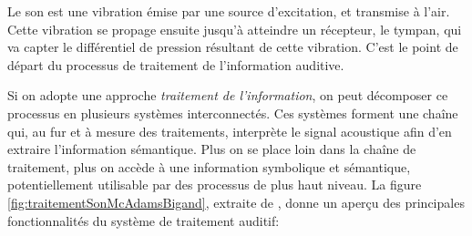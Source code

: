 Le son est une vibration émise par une source d'excitation, et transmise à l'air. Cette vibration se propage ensuite jusqu'à atteindre un récepteur, le tympan, qui va capter le différentiel de pression résultant de cette vibration. C'est le point de départ du processus de traitement de l'information auditive. 

Si on adopte une approche \emph{traitement de l'information}, on peut décomposer ce processus en plusieurs systèmes interconnectés. Ces systèmes forment une chaîne qui, au fur et à mesure des traitements, interprète le signal acoustique afin d'en extraire l'information sémantique. Plus on se place loin dans la chaîne de traitement, plus on accède à une information symbolique et sémantique, potentiellement utilisable par des processus de plus haut niveau. La figure \ref{fig:traitementSonMcAdamsBigand}, extraite de \citep{mcadams1994penser}, donne un aperçu des principales fonctionnalités du système de traitement auditif:

